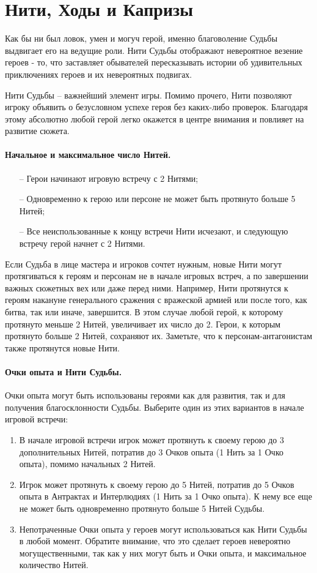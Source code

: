 \section{Нити, Ходы и Капризы}
Как бы ни был ловок, умен и могуч герой, именно благоволение Судьбы выдвигает его на ведущие роли. Нити Судьбы отображают невероятное везение героев - то,
что заставляет обывателей пересказывать истории об удивительных приключениях героев и их невероятных подвигах. 
\begin{tcolorbox}
    Нити Судьбы – важнейший элемент игры. Помимо прочего, Нити позволяют игроку объявить о безусловном успехе героя без каких-либо проверок. Благодаря этому абсолютно любой герой легко окажется в центре внимания и повлияет на развитие сюжета.
\end{tcolorbox}

\paragraph{Начальное и максимальное число Нитей.}
\begin{itemize}
    \item[--] Герои начинают игровую встречу с 2 Нитями;
    \item[--] Одновременно к герою или персоне не может быть протянуто больше 5 Нитей;
    \item[--] Все неиспользованные к концу встречи Нити исчезают, и следующую встречу герой начнет с 2 Нитями.
\end{itemize}
Если Судьба в лице мастера и игроков сочтет нужным, новые Нити могут протягиваться к героям и персонам не в начале игровых встреч, а по завершении важных сюжетных вех или даже перед ними. Например, Нити протянутся к героям накануне генерального сражения с вражеской армией или после того, как битва, так или иначе, завершится. В этом случае любой герой, к которому протянуто меньше 2 Нитей, увеличивает их число до 2. Герои, к которым протянуто больше 2 Нитей, сохраняют их. Заметьте, что к персонам-антагонистам также протянутся новые Нити.
\paragraph{Очки опыта и Нити Судьбы.} Очки опыта могут быть использованы героями как для развития, так и для получения благосклонности Судьбы. Выберите один из этих вариантов в начале игровой встречи:
\begin{enumerate}
    \item В начале игровой встречи игрок может протянуть к своему герою до 3 дополнительных Нитей, потратив до 3 Очков опыта (1 Нить за 1 Очко опыта), помимо начальных 2 Нитей.
    \item Игрок может протянуть к своему герою до 5 Нитей, потратив до 5 Очков опыта в Антрактах и Интерлюдиях (1 Нить за 1 Очко опыта). К нему все еще не может быть одновременно протянуто больше 5 Нитей Судьбы.
    \item Непотраченные Очки опыта у героев могут использоваться как Нити Судьбы в любой момент. Обратите внимание, что это сделает героев невероятно могущественными, так как у них могут быть и Очки опыта, и максимальное количество Нитей.
\end{enumerate}

